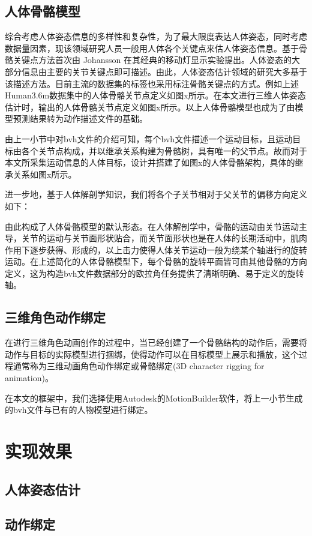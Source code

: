 \subsection{人体骨骼模型}{}
综合考虑人体姿态信息的多样性和复杂性，为了最大限度表达人体姿态，同时考虑数据量因素，现该领域研究人员一般用人体各个关键点来估人体姿态信息。基于骨骼关键点方法首次由  Johansson 在其经典的移动灯显示实验提出。人体姿态的大部分信息由主要的关节关键点即可描述。由此，人体姿态估计领域的研究大多基于该描述方法。目前主流的数据集的标签也采用标注骨骼关键点的方式。例如上述Human3.6m数据集中的人体骨骼关节点定义如图x所示。在本文进行三维人体姿态估计时，输出的人体骨骼关节点定义如图x所示。以上人体骨骼模型也成为了由模型预测结果转为动作描述文件的基础。

由上一小节中对bvh文件的介绍可知，每个bvh文件描述一个运动目标，且运动目标由各个关节点构成，并以继承关系构建为骨骼树，具有唯一的父节点。故而对于本文所采集运动信息的人体目标，设计并搭建了如图x的人体骨骼架构，具体的继承关系如图x所示。

进一步地，基于人体解剖学知识，我们将各个子关节相对于父关节的偏移方向定义如下：

由此构成了人体骨骼模型的默认形态。在人体解剖学中，骨骼的运动由关节运动主导，关节的运动与关节面形状贴合，而关节面形状也是在人体的长期活动中，肌肉作用下逐步获得、形成的，以上击力使得人体关节运动一般为绕某个轴进行的旋转运动。在上述简化的人体骨骼模型下，每个骨骼的旋转平面皆可由其他骨骼的方向定义，这为构造bvh文件数据部分的欧拉角任务提供了清晰明确、易于定义的旋转轴。

\subsection{三维角色动作绑定}{}
在进行三维角色动画创作的过程中，当已经创建了一个骨骼结构的动作后，需要将动作与目标的实际模型进行捆绑，使得动作可以在目标模型上展示和播放，这个过程通常称为三维动画角色动作绑定或骨骼绑定(3D character rigging for animation)。

在本文的框架中，我们选择使用Autodesk的MotionBuilder软件，将上一小节生成的bvh文件与已有的人物模型进行绑定。


\section{实现效果}

\subsection{人体姿态估计}{}

\subsection{动作绑定}{}
